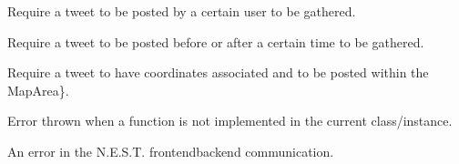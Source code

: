 \documentclass[letterpaper,10pt,italian]{sphinxmanual}
\begin{document}

\begin{fulllineitems}
\label{\detokenize{code/frontend/index:ConditionUser}}
\sphinxAtStartPar
Require a tweet to be posted by a certain user to be gathered.

\end{fulllineitems}


\begin{fulllineitems}
\label{\detokenize{code/frontend/index:ConditionTime}}
\sphinxAtStartPar
Require a tweet to be posted before or after a certain time to be gathered.

\end{fulllineitems}


\begin{fulllineitems}
\label{\detokenize{code/frontend/index:ConditionLocation}}
\sphinxAtStartPar
Require a tweet to have coordinates associated and to be posted within the  MapArea\}.

\end{fulllineitems}


\begin{fulllineitems}
\label{\detokenize{code/frontend/index:NotImplementedError}}
\sphinxAtStartPar
Error thrown when a function is not implemented in the current class/instance.

\end{fulllineitems}


\begin{fulllineitems}
\label{\detokenize{code/frontend/index:BackendCommunicationError}}
\sphinxAtStartPar
An error in the N.E.S.T. frontend\sphinxhyphen{}backend communication.

\end{fulllineitems}
\end{document}
